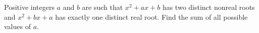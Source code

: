 Positive integers $a$ and $b$ are such that $x^2+ax+b$ has two distinct nonreal roots and $x^2+bx+a$ has exactly one distinct real root. Find the sum of all possible values of $a$.
